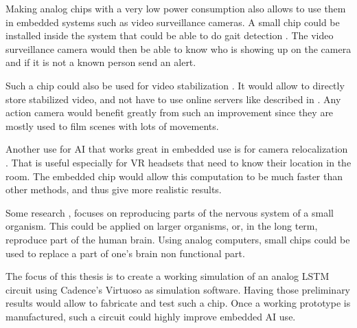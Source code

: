 Making analog chips with a very low power consumption also allows to use them in embedded systems such as video surveillance cameras. A small chip could be installed inside the system that could be able to do gait detection \cite{gaitDS,gaitDig,gait}. The video surveillance camera would then be able to know who is showing up on the camera and if it is not a known person send an alert.

Such a chip could also be used for video stabilization \cite{videoStab}. It would allow to directly store stabilized video, and not have to use online servers like described in \cite{videoStab}. Any action camera would benefit greatly from such an improvement since they are mostly used to film scenes with lots of movements.

Another use for \ac{AI} that works great in embedded use is for camera relocalization \cite{videoReloc}. That is useful especially for \ac{VR} headsets that need to know their location in the room. The embedded chip would allow this computation to be much faster than other methods, and thus give more realistic results.

Some research \cite{celegans}, focuses on reproducing parts of the nervous system of a small organism. This could be applied on larger organisms, or, in the long term, reproduce part of the human brain. Using analog computers, small chips could be used to replace a part of one's brain non functional part.

The focus of this thesis is to create a working simulation of an analog \ac{LSTM} circuit using Cadence's Virtuoso as simulation software. Having those preliminary results would allow to fabricate and test such a chip. Once a working prototype is manufactured, such a circuit could highly improve embedded \ac{AI} use.

